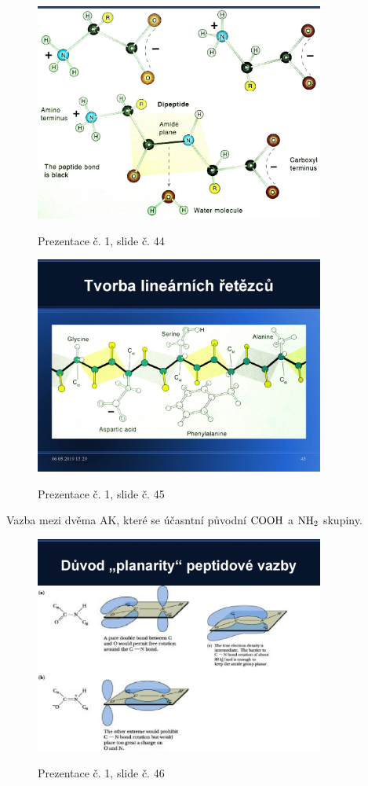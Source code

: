 \documentclass[DIV=8]{scrreprt}
\begin{document}
\begin{figure}
    \caption{Prezentace č. 1, slide č. 44}
    \includegraphics[width=0.85\textwidth]{slides-1/slide-44.jpg}
    \centering
    \label{slides-1-slide-44}
\end{figure}
\begin{figure}
    \caption{Prezentace č. 1, slide č. 45}
    \includegraphics[width=0.85\textwidth]{slides-1/slide-45.jpg}
    \centering
    \label{slides-1-slide-45}
\end{figure}

Vazba mezi dvěma AK, které se účasntní původní \(\ce{COOH}\) a \(\ce{NH2}\) skupiny.

\begin{figure}
    \caption{Prezentace č. 1, slide č. 46}
    \includegraphics[width=0.85\textwidth]{slides-1/slide-46.jpg}
    \centering
    \label{slides-1-slide-46}
\end{figure}
\end{document}

